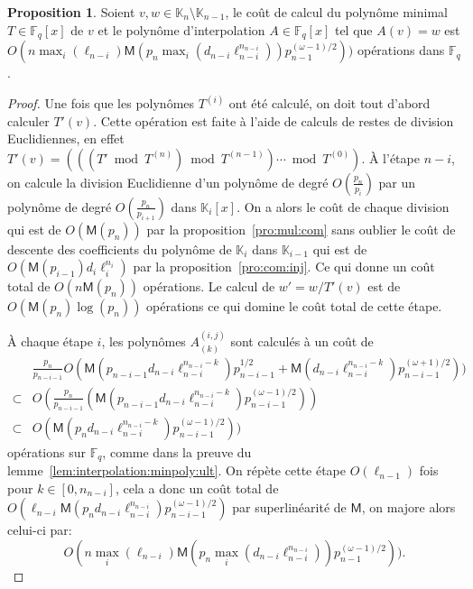 \documentclass[10pt,a4paper]{book}
\theoremstyle{plain}
\theoremstyle{definition}
\theoremstyle{definition}
\theoremstyle{definition}
\newtheorem{prop}[thm]{Proposition}
\theoremstyle{definition}
\theoremstyle{remark}
\theoremstyle{remark}
\theoremstyle{definition}
\begin{document}
\begin{prop}
  Soient $v,w\in \mathbb{K}_n\setminus \mathbb{K}_{n-1}$, le coût de calcul du polynôme minimal
  $T\in \mathbb{F}_q[x]$ de $v$ et le polynôme d'interpolation $A\in 
  \mathbb{F}_q[x]$ tel que $A(v)=w$ est $O(n\max_i(\ell_{n-i})\mathsf{M}(p_{n}\max_i(d_{n-i}\ell_{n-i}^{n_{n-i}}))p_{n-1}^{(\omega-1)/2}))$ 
  opérations dans $\mathbb{F}_q$.
\end{prop}
\begin{proof}
  Une fois que les polynômes $T^{(i)}$ ont été calculé, on doit tout d'abord 
  calculer $T'(v)$. Cette opération est faite à l'aide de calculs de restes de 
  division Euclidiennes, en effet
  $T'(v) = (((T' \bmod T^{(n)}) \bmod T^{(n-1)}) \cdots \bmod T^{(0)})$.
  \`A l'étape $n-i$, on calcule la division Euclidienne d'un polynôme de degré
   $O(\frac{p_n}{p_i})$ par un polynôme de degré $O(\frac{p_n}{p_{i+1}})$ dans  $\mathbb{K}_i[x]$. 
   On a alors le coût de chaque division qui est de $O(\mathsf{M}(p_n))$ 
   par la proposition~\ref{pro:mul:com} sans oublier le coût de descente des 
   coefficients du polynôme de $\mathbb{K}_i$ dans $\mathbb{K}_{i-1}$ qui est 
   de $O(\mathsf{M}(p_{i-1})d_i\ell_i^{n_i})$ par la proposition~\ref{pro:com:inj}.
   Ce qui donne un coût total de $O(n\mathsf{M}(p_n))$ opérations.
   Le calcul de $w'=w/T'(v)$ est de $O(\mathsf{M}(p_n)\log(p_n))$ opérations ce
   qui domine le coût total de cette étape.

  \`A chaque étape $i$, les polynômes $A^{(i,j)}_{(k)}$ sont calculés à un coût de
  \begin{equation*}
  \begin{alignedat}{1}
  &\frac{p_n}{p_{n-i-1}}O(\mathsf{M}(p_{n-i-1}d_{n-i}\ell_{n-i}^{n_{n-i}-k})p_{n-i-1}^{1/2}+\mathsf{M}(d_{n-i}\ell_{n-i}^{n_{n-i}-k})p_{n-i-1}^{(\omega+1)/2})) \\
  \subset & O(\frac{p_n}{p_{n-i-1}}(\mathsf{M}(p_{n-i-1}d_{n-i}\ell_{n-i}^{n_{n-i}-k})p_{n-i-1}^{(\omega-1)/2})) \\
  \subset & O(\mathsf{M}(p_{n}d_{n-i}\ell_{n-i}^{n_{n-i}-k})p_{n-i-1}^{(\omega-1)/2}))
  \end{alignedat}
  \end{equation*}
  opérations sur $\mathbb{F}_q$, comme dans la preuve du  
  lemme~\ref{lem:interpolation:minpoly:ult}. On répète cette étape 
  $O(\ell_{n-1})$ fois pour $k \in [0,n_{n-i}]$, cela a donc un coût total de 
  $O(\ell_{n-i}\mathsf{M}(p_nd_{n-i}\ell_{n-i}^{n_{n-i}})p_{n-i-1}^{(\omega-1)/2})$
  par superlinéarité de $\mathsf{M}$, on majore alors celui-ci par:
  \[
  O(n\max_i(\ell_{n-i})\mathsf{M}(p_{n}\max_i(d_{n-i}\ell_{n-i}^{n_{n-i}}))p_{n-1}^{(\omega-1)/2})).
  \]
  

\end{proof}
\end{document}
